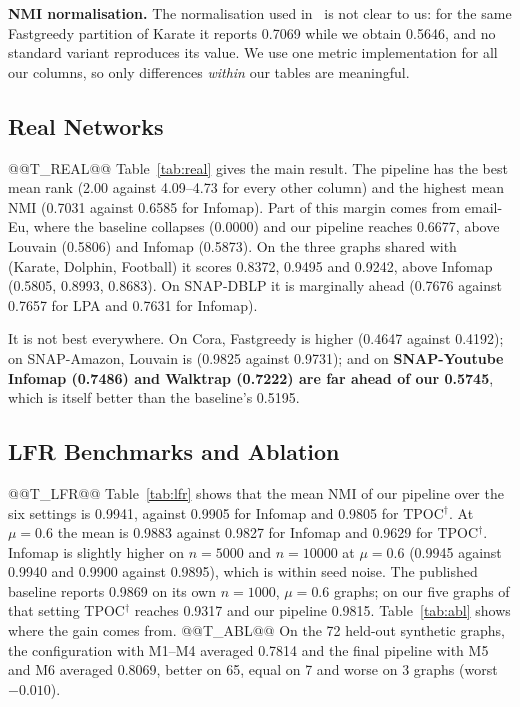 \documentclass[conference]{IEEEtran}
\begin{document}
\textbf{NMI normalisation.} The normalisation used in~\cite{kong2026} is not clear to us: for the same Fastgreedy partition of Karate it reports 0.7069 while we obtain 0.5646, and no standard variant reproduces its value. We use one metric implementation for all our columns, so only differences \emph{within} our tables are meaningful.

\subsection{Real Networks}
@@T_REAL@@
Table~\ref{tab:real} gives the main result. The pipeline has the best mean rank (2.00 against 4.09--4.73 for every other column) and the highest mean NMI (0.7031 against 0.6585 for Infomap). Part of this margin comes from email-Eu, where the baseline collapses (0.0000) and our pipeline reaches 0.6677, above Louvain (0.5806) and Infomap (0.5873). On the three graphs shared with~\cite{kong2026} (Karate, Dolphin, Football) it scores 0.8372, 0.9495 and 0.9242, above Infomap (0.5805, 0.8993, 0.8683). On SNAP-DBLP it is marginally ahead (0.7676 against 0.7657 for LPA and 0.7631 for Infomap).

It is not best everywhere. On Cora, Fastgreedy is higher (0.4647 against 0.4192); on SNAP-Amazon, Louvain is (0.9825 against 0.9731); and on \textbf{SNAP-Youtube Infomap (0.7486) and Walktrap (0.7222) are far ahead of our 0.5745}, which is itself better than the baseline's 0.5195.

\subsection{LFR Benchmarks and Ablation}
@@T_LFR@@
Table~\ref{tab:lfr} shows that the mean NMI of our pipeline over the six settings is 0.9941, against 0.9905 for Infomap and 0.9805 for TPOC$^{\dagger}$. At $\mu{=}0.6$ the mean is 0.9883 against 0.9827 for Infomap and 0.9629 for TPOC$^{\dagger}$. Infomap is slightly higher on $n{=}5000$ and $n{=}10000$ at $\mu{=}0.6$ (0.9945 against 0.9940 and 0.9900 against 0.9895), which is within seed noise. The published baseline reports 0.9869 on its own $n{=}1000$, $\mu{=}0.6$ graphs; on our five graphs of that setting TPOC$^{\dagger}$ reaches 0.9317 and our pipeline 0.9815. Table~\ref{tab:abl} shows where the gain comes from.
@@T_ABL@@
On the 72 held-out synthetic graphs, the configuration with M1--M4 averaged 0.7814 and the final pipeline with M5 and M6 averaged 0.8069, better on 65, equal on 7 and worse on 3 graphs (worst $-0.010$).
\end{document}
